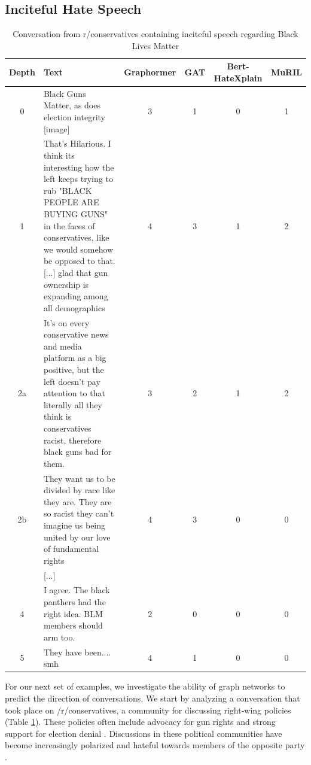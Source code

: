 \documentclass[letterpaper]{article} %
\begin{document}
\subsection{Inciteful Hate Speech}
\begin{table}
    \centering
        \caption{Conversation from r/conservatives containing inciteful speech regarding Black Lives Matter \\}
    \begin{tabular}{c|p{8cm}|c|c|c|c}
        Depth & Text & Graphormer & GAT & Bert-HateXplain & MuRIL \\
        \hline
        \hline
        0 & Black Guns Matter, as does election integrity [image] & 3 & 1 & 0 & 1 \\
        \hline
        1 & That's Hilarious. I think its interesting how the left keeps trying to rub "BLACK PEOPLE ARE BUYING GUNS" in the faces of conservatives, like we would somehow be opposed to that. [...] glad that gun ownership is expanding among all demographics & 4 & 3 & 1 & 2  \\
        \hline 
        2a & It's on every conservative news and media platform as a big positive, but the left doesn't pay attention to that literally all they think is conservatives racist, therefore black guns bad for them. & 3 & 2 & 1 & 2 \\
        \hline
        2b & They want us to be divided by race like they are. They are so racist they can't imagine us being united by our love of fundamental rights & 4 & 3 & 0 & 0\\
        \hline
          & [...] & & \\
        \hline
        4 & I agree. The black panthers had the right idea. BLM members should arm too. & 2 & 0 & 0 & 0 \\
        \hline
        5 & They have been.... smh & 4 & 1 & 0 & 0\\
    \end{tabular}

    \label{tab:predictive-conservative}
\end{table}
For our next set of examples, we investigate the ability of graph networks to predict the direction of conversations. We start by analyzing a conversation that took place on /r/conservatives, a community for discussing right-wing policies (Table \ref{tab:predictive-conservative}). These policies often include advocacy for gun rights and strong support for election denial \cite{block_2021}. Discussions in these political communities have become increasingly polarized and hateful towards members of the opposite party \cite{Waller2021}.
\end{document}
